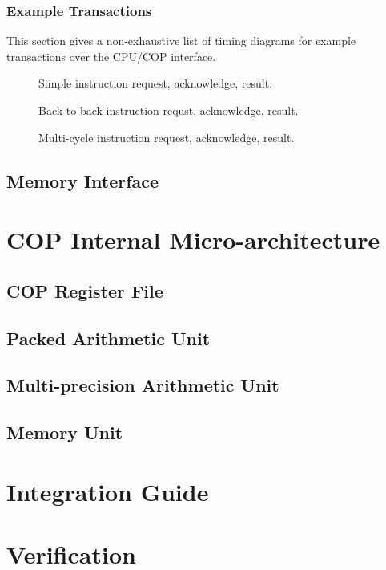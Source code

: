 \documentclass{article}
\begin{document}
\subsubsection{Example Transactions}

This section gives a non-exhaustive list of timing diagrams for example
transactions over the CPU/COP interface.

\begin{figure}[h]
\caption{Simple instruction request, acknowledge, result.}
\end{figure}

\begin{figure}[h]
\caption{Back to back instruction requst, acknowledge, result.}
\end{figure}

\begin{figure}[h]
\caption{Multi-cycle instruction request, acknowledge, result.}
\end{figure}

\subsection{Memory Interface}


\section{COP Internal Micro-architecture}
\label{sec:cop-microarch}

\subsection{COP Register File}

\subsection{Packed Arithmetic Unit}

\subsection{Multi-precision Arithmetic Unit}

\subsection{Memory Unit}


\section{Integration Guide}
\label{sec:integration}


\section{Verification}
\label{sec:verification}


\printbibliography
\end{document}
